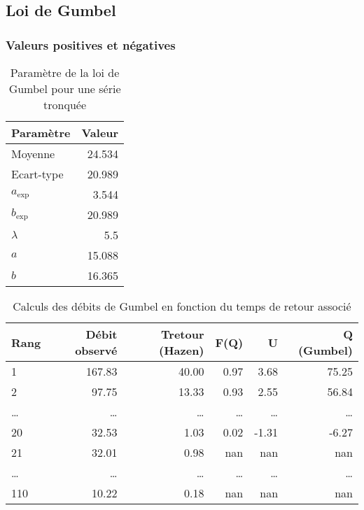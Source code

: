 \subsection{Loi de Gumbel}
\subsubsection{Valeurs positives et négatives}
\begin{table}[H]
    \centering
    \begin{tabular}{l|r}
        \toprule
        \textbf{Paramètre} & \textbf{Valeur} \\
        \midrule
        Moyenne            & 24.534          \\
        Ecart-type         & 20.989          \\
        \midrule
        $a_\text{exp}$     & 3.544           \\
        $b_\text{exp}$     & 20.989          \\
        \midrule
        $\lambda$          & 5.5             \\
        $a$                & 15.088          \\
        $b$                & 16.365          \\
        \bottomrule
    \end{tabular}
    \caption{Paramètre de la loi de Gumbel pour une série tronquée}
    \label{tab:param_Gumbel_tronquees}
\end{table}

\begin{table}[H]
    \centering
    \begin{tabular}{l|r|r|r|r|r}
        \toprule
        \textbf{Rang} & \textbf{Débit observé} & \textbf{Tretour (Hazen)} & \textbf{F(Q)} & \textbf{U} & \textbf{Q (Gumbel)} \\
        \midrule
        1             & 167.83                 & 40.00                    & 0.97          & 3.68       & 75.25               \\
        2             & 97.75                  & 13.33                    & 0.93          & 2.55       & 56.84               \\
        \dots         & \dots                  & \dots                    & \dots         & \dots      & \dots               \\
        20            & 32.53                  & 1.03                     & 0.02          & -1.31      & -6.27               \\
        21            & 32.01                  & 0.98                     & nan           & nan        & nan                 \\
        \dots         & \dots                  & \dots                    & \dots         & \dots      & \dots               \\
        110           & 10.22                  & 0.18                     & nan           & nan        & nan                 \\
        \bottomrule
    \end{tabular}
    \caption{Calculs des débits de Gumbel en fonction du temps de retour associé}
    \label{tab:gumbelcalcul_tronquees}
\end{table}

